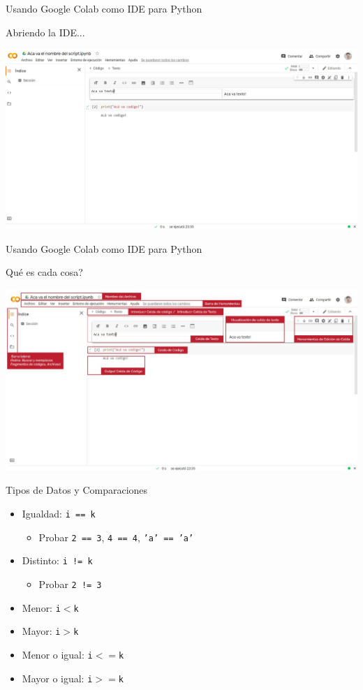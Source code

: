 \documentclass{beamer}
\begin{document}
\begin{frame}{Usando Google Colab como IDE para Python}
\begin{block}{Abriendo la IDE...}
\end{block}
\includegraphics[scale = 0.23]{recursos/colab_raw.jpeg}
\end{frame}


\begin{frame}{Usando Google Colab como IDE para Python}
\begin{block}{Qué es cada cosa?}
\end{block}
\includegraphics[scale = 0.23]{recursos/colab_edit.jpeg}
\end{frame}


\begin{frame}{Tipos de Datos y Comparaciones}
\begin{itemize}
	\item Igualdad: \texttt{i == k}\pause
	\begin{itemize}
		\item Probar \texttt{2 == 3}, \texttt{4 == 4}, \texttt{'a' == 'a'}
	\end{itemize}\pause
	\item Distinto: \texttt{i != k}\pause
	\begin{itemize}
		\item  Probar \texttt{2 != 3}
	\end{itemize}\pause
	\item Menor: \texttt{i$<$k}\pause
	\item Mayor: \texttt{i$>$k}\pause
	\item Menor o igual: \texttt{i$<=$k}\pause
	\item Mayor o igual: \texttt{i$>=$k}
\end{itemize}
\end{frame}
\end{document}
